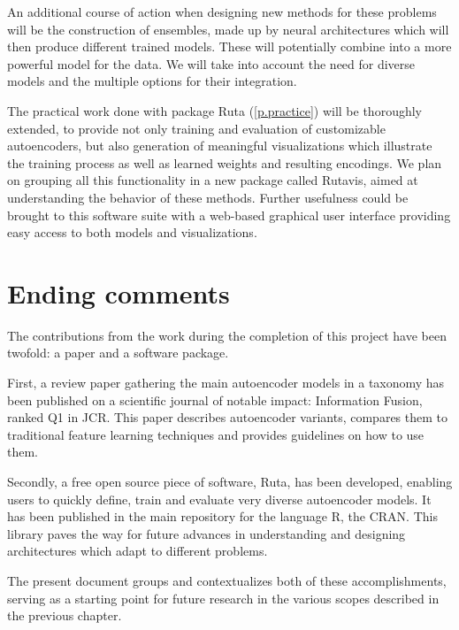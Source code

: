 \documentclass[oneside,openright,titlepage,numbers=noenddot,openany,headinclude,footinclude=true,
cleardoublepage=empty,abstractoff,BCOR=5mm,paper=a4,fontsize=12pt,main=spanish]{scrreprt}
\begin{document}
An additional course of action when designing new methods for these problems will be the construction of ensembles, made up by neural architectures which will then produce different trained models. These will potentially combine into a more powerful model for the data. We will take into account the need for diverse models and the multiple options for their integration.

The practical work done with package Ruta (\autoref{p.practice}) will be thoroughly extended, to provide not only training and evaluation of customizable autoencoders, but also generation of meaningful visualizations which illustrate the training process as well as learned weights and resulting encodings. We plan on grouping all this functionality in a new package called Rutavis, aimed at understanding the behavior of these methods. Further usefulness could be brought to this software suite with a web-based graphical user interface providing easy access to both models and visualizations.


\chapter{Ending comments}

The contributions from the work during the completion of this project have been twofold: a paper and a software package.

First, a review paper gathering the main autoencoder models in a taxonomy has been published on a scientific journal of notable impact: Information Fusion, ranked Q1 in JCR. This paper describes autoencoder variants, compares them to traditional feature learning techniques and provides guidelines on how to use them.

Secondly, a free open source piece of software, Ruta, has been developed, enabling users to quickly define, train and evaluate very diverse autoencoder models. It has been published in the main repository for the language R, the CRAN. This library paves the way for future advances in understanding and designing architectures which adapt to different problems.

The present document groups and contextualizes both of these accomplishments, serving as a starting point for future research in the various scopes described in the previous chapter.


   
\end{document}
